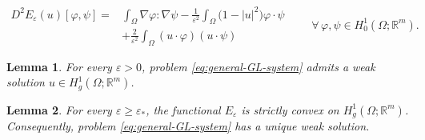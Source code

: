\documentclass[10pt,a4paper]{amsart}
\newtheorem{lemma}{Lemma}
\newcommand{\R}{\mathbb{R}}
\newcommand{\abs}[1]{\lvert#1\rvert}
\begin{document}
\begin{equation}\label{eq:second-variation}
	\begin{aligned}
		D^2E_\varepsilon(u)[\varphi,\psi]
		={}&
		\int_\Omega
		\nabla\varphi:\nabla\psi
		-
		\frac{1}{\varepsilon^2}
		\int_\Omega
		\bigl(1-\abs{u}^2\bigr)\varphi\cdot\psi\\
		&+
		\frac{2}{\varepsilon^2}
		\int_\Omega
		(u\cdot\varphi)(u\cdot\psi)
	\end{aligned}
	\qquad
	\forall\,\varphi,\psi\in H_0^1(\Omega;\R^m).
\end{equation}

\begin{lemma}\label{lem:existence}
	For every $\varepsilon>0$, problem
	\eqref{eq:general-GL-system} admits a weak solution
	$u\in H_g^1(\Omega;\R^m)$.
\end{lemma}

\begin{lemma}\label{lem:convexity-threshold}
	For every $\varepsilon\geq\varepsilon_*$, the functional
	$E_\varepsilon$ is strictly convex on
	$H_g^1(\Omega;\R^m)$. Consequently,
	problem \eqref{eq:general-GL-system} has a unique weak solution.
\end{lemma}
\end{document}
